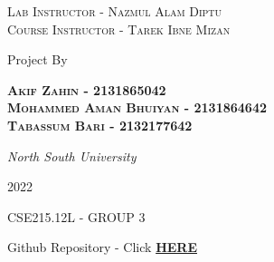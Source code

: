 \documentclass[a4paper,12pt]{article}
\begin{document}
\begin{titlepage}
	{\scshape\large  Lab Instructor - Nazmul Alam Diptu \\Course Instructor - Tarek Ibne Mizan \\}
	
        \vspace*{3\baselineskip} %
	
	
	\large Project By
	
	\vspace{0.5\baselineskip} %
	
	{\scshape\large \textbf{Akif Zahin - 2131865042 \\ Mohammed Aman Bhuiyan - 2131864642 \\ Tabassum Bari - 2132177642 \\} } %
	
	\vspace{0.5\baselineskip} %
	
	\textit{\large North South University  } %
	
	\vfill %
        
        
	
	
	\vspace{0.3\baselineskip} %
	
	2022 %
	
	{\normalsize CSE215.12L - GROUP 3 } %

\end{titlepage}



\tableofcontents
\vspace{3cm}
\begin{center}
    \large Github Repository - Click \href{https://github.com/akifzahin/CSE215.12L-Group-3-School-Management-System}{\textbf{HERE}} 
\end{center}
\end{document}
